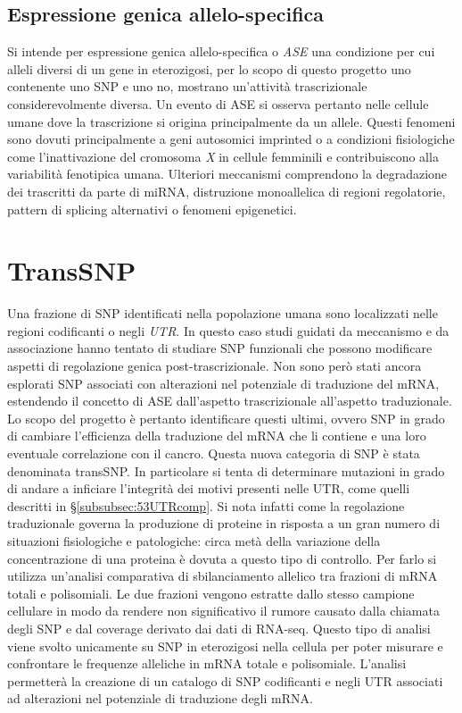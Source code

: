 \subsection{Espressione genica allelo-specifica}
Si intende per espressione genica allelo-specifica o \emph{ASE} una condizione per cui alleli diversi di un gene in eterozigosi, per lo scopo di questo progetto uno contenente uno SNP e uno no, mostrano un'attivit\`a trascrizionale considerevolmente diversa.
Un evento di ASE si osserva pertanto nelle cellule umane dove la trascrizione si origina principalmente da un allele.
Questi fenomeni sono dovuti principalmente a geni autosomici imprinted o a condizioni fisiologiche come l'inattivazione del cromosoma \emph{X} in cellule femminili e contribuiscono alla variabilit\`a fenotipica umana.
Ulteriori meccanismi comprendono la degradazione dei trascritti da parte di miRNA, distruzione monoallelica di regioni regolatorie, pattern di splicing alternativi o fenomeni epigenetici.

\section{TransSNP}
Una frazione di SNP identificati nella popolazione umana sono localizzati nelle regioni codificanti o negli \emph{UTR}.
In questo caso studi guidati da meccanismo e da associazione hanno tentato di studiare SNP funzionali che possono modificare aspetti di regolazione genica post-trascrizionale.
Non sono per\`o stati ancora esplorati SNP associati con alterazioni nel potenziale di traduzione del mRNA, estendendo il concetto di ASE dall'aspetto trascrizionale all'aspetto traduzionale.
Lo scopo del progetto \`e pertanto identificare questi ultimi, ovvero SNP in grado di cambiare l'efficienza della traduzione del mRNA che li contiene e una loro eventuale correlazione con il cancro.
Questa nuova categoria di SNP \`e stata denominata transSNP.
In particolare si tenta di determinare mutazioni in grado di andare a inficiare l'integrit\`a dei motivi presenti nelle UTR, come quelli descritti in \S\ref{subsubsec:53UTRcomp}.
Si nota infatti come la regolazione traduzionale governa la produzione di proteine in risposta a un gran numero di situazioni fisiologiche e patologiche: circa met\`a della variazione della concentrazione di una proteina \`e dovuta a questo tipo di controllo.
Per farlo si utilizza un'analisi comparativa di sbilanciamento allelico tra frazioni di mRNA totali e polisomiali.
Le due frazioni vengono estratte dallo stesso campione cellulare in modo da rendere non significativo il rumore causato dalla chiamata degli SNP e dal coverage derivato dai dati di RNA-seq.
Questo tipo di analisi viene svolto unicamente su SNP in eterozigosi nella cellula per poter misurare e confrontare le frequenze alleliche in mRNA totale e polisomiale.
L'analisi permetter\`a  la creazione di un catalogo di SNP codificanti e negli UTR associati ad alterazioni nel potenziale di traduzione degli mRNA.


